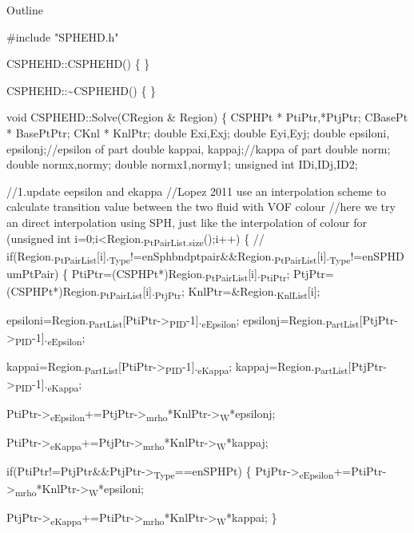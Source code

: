 \documentclass[presentation]{beamer}
\author{stardiviner}
\date{\today}
\title{}
\begin{document}
\begin{frame}{Outline}
\tableofcontents
\end{frame}

\#include "SPHEHD.h"


CSPHEHD::CSPHEHD()
\{
\}

CSPHEHD::\textasciitilde{}CSPHEHD()
\{
\}

void CSPHEHD::Solve(CRegion \& Region)
\{
  CSPHPt * PtiPtr,*PtjPtr;
  CBasePt * BasePtPtr;
  CKnl * KnlPtr;
  double Exi,Exj;
  double Eyi,Eyj;
  double epsiloni, epsilonj;//epsilon of part
  double kappai, kappaj;//kappa of part
  double norm;
  double normx,normy;
  double normx1,normy1;
  unsigned int IDi,IDj,ID2;

//1.update eepsilon and ekappa
//Lopez 2011 use an interpolation scheme to calculate transition value between the two fluid with VOF colour
//here we try an direct interpolation using SPH, just like the interpolation of colour
for (unsigned int i=0;i<Region.\textsubscript{PtPairList.size}();i++)
  \{
    // if(Region.\textsubscript{PtPairList}[i].\textsubscript{Type}!=enSphbndptpair\&\&Region.\textsubscript{PtPairList}[i].\textsubscript{Type}!=enSPHDumPtPair)
    \{
      PtiPtr=(CSPHPt*)Region.\textsubscript{PtPairList}[i].\textsubscript{PtiPtr};
      PtjPtr=(CSPHPt*)Region.\textsubscript{PtPairList}[i].\textsubscript{PtjPtr};
      KnlPtr=\&Region.\textsubscript{KnlList}[i];

epsiloni=Region.\textsubscript{PartList}[PtiPtr->\textsubscript{PID}-1].\textsubscript{eEpsilon};
epsilonj=Region.\textsubscript{PartList}[PtjPtr->\textsubscript{PID}-1].\textsubscript{eEpsilon};

kappai=Region.\textsubscript{PartList}[PtiPtr->\textsubscript{PID}-1].\textsubscript{eKappa};
kappaj=Region.\textsubscript{PartList}[PtjPtr->\textsubscript{PID}-1].\textsubscript{eKappa};

PtiPtr->\textsubscript{eEpsilon}+=PtjPtr->\textsubscript{mrho}*KnlPtr->\textsubscript{W}*epsilonj;

PtiPtr->\textsubscript{eKappa}+=PtjPtr->\textsubscript{mrho}*KnlPtr->\textsubscript{W}*kappaj;

if(PtiPtr!=PtjPtr\&\&PtjPtr->\textsubscript{Type}==enSPHPt)
  \{
    PtjPtr->\textsubscript{eEpsilon}+=PtiPtr->\textsubscript{mrho}*KnlPtr->\textsubscript{W}*epsiloni;

  PtjPtr->\textsubscript{eKappa}+=PtiPtr->\textsubscript{mrho}*KnlPtr->\textsubscript{W}*kappai;
\}
\end{document}
